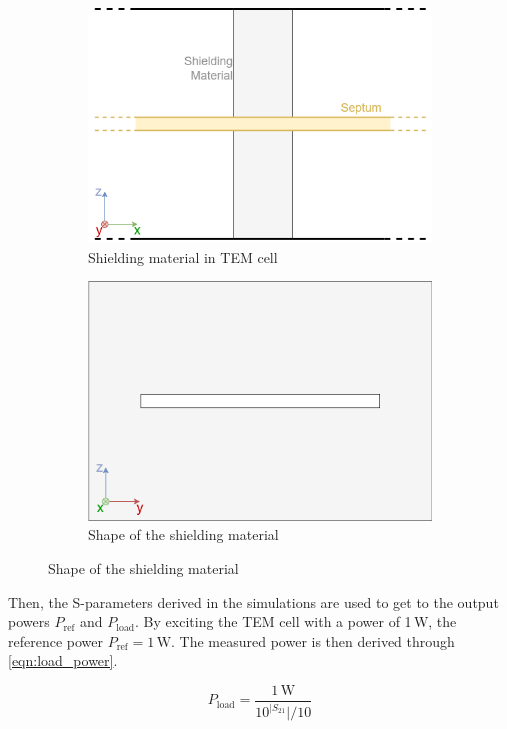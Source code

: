\begin{figure}[h]
    \centering
    \begin{subfigure}[h]{0.49\textwidth}
        \centering
        \includegraphics[width=\textwidth]{Documentation//content//10_theory//img/ASTM ES7-83.png}
        \caption{Shielding material in TEM cell}
        \label{fig:ASTM ES7-83}
    \end{subfigure}%
    \hfill
    \begin{subfigure}[h]{0.49\textwidth}
        \centering
        \includegraphics[width=\textwidth]{Documentation//content//10_theory/img/form_of_shielding_material.png}
        \caption{Shape of the shielding material}
        \label{fig:form_of_shielding_material}
    \end{subfigure}
    \label{fig:subfigures}
\end{figure}

Then, the S-parameters derived in the simulations are used to get to the output powers $P_\mathrm{ref}$ and $P_\mathrm{load}$. By exciting the TEM cell with a power of 1\,W, the reference power $P_\mathrm{ref}=1\,\mathrm{W}$. The measured power is then derived through \autoref{eqn:load_power}.

\begin{equation}
    P_\mathrm{load}=\frac{1\,\mathrm{W}}{10^{|S_\mathrm{21}}|/10}
    \label{eqn:load_power}
\end{equation}


